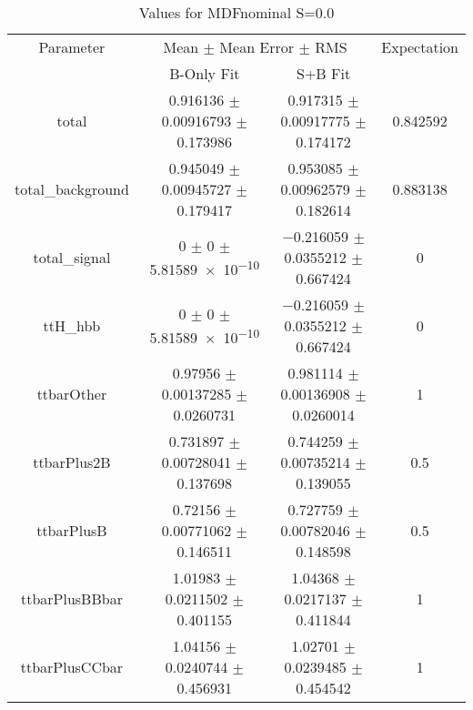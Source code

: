 \begin{table}
\centering
\caption{Values for MDFnominal S=0.0}
\begin{tabular}{cccc}
\toprule
Parameter & \multicolumn{2}{c}{Mean $\pm$ Mean Error $\pm$ RMS} & Expectation\\
 & B-Only Fit & S+B Fit & \\
\midrule
total & \num{0.916136} $\pm$ \num{0.00916793} $\pm$ \num{0.173986} & \num{0.917315} $\pm$ \num{0.00917775} $\pm$ \num{0.174172} & \num{0.842592}\\
total\_background & \num{0.945049} $\pm$ \num{0.00945727} $\pm$ \num{0.179417} & \num{0.953085} $\pm$ \num{0.00962579} $\pm$ \num{0.182614} & \num{0.883138}\\
total\_signal & \num{0} $\pm$ \num{0} $\pm$ \num{5.81589e-10} & \num{-0.216059} $\pm$ \num{0.0355212} $\pm$ \num{0.667424} & \num{0}\\
ttH\_hbb & \num{0} $\pm$ \num{0} $\pm$ \num{5.81589e-10} & \num{-0.216059} $\pm$ \num{0.0355212} $\pm$ \num{0.667424} & \num{0}\\
ttbarOther & \num{0.97956} $\pm$ \num{0.00137285} $\pm$ \num{0.0260731} & \num{0.981114} $\pm$ \num{0.00136908} $\pm$ \num{0.0260014} & \num{1}\\
ttbarPlus2B & \num{0.731897} $\pm$ \num{0.00728041} $\pm$ \num{0.137698} & \num{0.744259} $\pm$ \num{0.00735214} $\pm$ \num{0.139055} & \num{0.5}\\
ttbarPlusB & \num{0.72156} $\pm$ \num{0.00771062} $\pm$ \num{0.146511} & \num{0.727759} $\pm$ \num{0.00782046} $\pm$ \num{0.148598} & \num{0.5}\\
ttbarPlusBBbar & \num{1.01983} $\pm$ \num{0.0211502} $\pm$ \num{0.401155} & \num{1.04368} $\pm$ \num{0.0217137} $\pm$ \num{0.411844} & \num{1}\\
ttbarPlusCCbar & \num{1.04156} $\pm$ \num{0.0240744} $\pm$ \num{0.456931} & \num{1.02701} $\pm$ \num{0.0239485} $\pm$ \num{0.454542} & \num{1}\\
\bottomrule
\end{tabular}
\end{table}